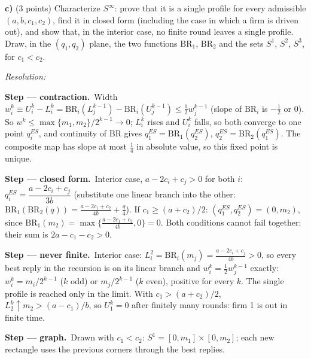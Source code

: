 \documentclass[11pt,a4paper]{article}
\newif\ifsolucoes
\newcommand{\espacoresol}{5cm}   %
\newcommand{\resolespaco}{\ifsolucoes\else\par\textit{Resolution:}\vspace{\espacoresol}\par\fi}
\newcommand{\passo}[2]{\par\smallskip\noindent\textbf{Step --- #1.}~#2}
\begin{document}
\textbf{c)} (3 points) Characterize $S^\infty$: prove that it is a single profile for every
admissible $(a,b,c_1,c_2)$, find it in closed form (including the case in which a firm is driven out),
and show that, in the interior case, no finite round leaves a single profile. Draw, in the
$(q_1,q_2)$ plane, the two functions $\mathrm{BR}_1$, $\mathrm{BR}_2$ and the sets $S^1$, $S^2$,
$S^3$, for $c_1<c_2$.
\resolespaco
\begin{sol}
\passo{contraction}{Width $w_i^k\equiv U_i^k-L_i^k=\mathrm{BR}_i(L_j^{k-1})-\mathrm{BR}_i(U_j^{k-1})\le\tfrac12w_j^{k-1}$
(slope of $\mathrm{BR}_i$ is $-\tfrac12$ or $0$). So $w^k\le\max\{m_1,m_2\}/2^{k-1}\to0$; $L_i^k$
rises and $U_i^k$ falls, so both converge to one point $q_i^{ES}$, and continuity of $\mathrm{BR}$
gives $q_1^{ES}=\mathrm{BR}_1(q_2^{ES})$, $q_2^{ES}=\mathrm{BR}_2(q_1^{ES})$. The composite map has
slope at most $\tfrac14$ in absolute value, so this fixed point is unique.}
\passo{closed form}{Interior case, $a-2c_i+c_j>0$ for both $i$:
$q_i^{ES}=\dfrac{a-2c_i+c_j}{3b}$ (substitute one linear branch into the other:
$\mathrm{BR}_1(\mathrm{BR}_2(q))=\tfrac{a-2c_1+c_2}{4b}+\tfrac q4$). If $c_1\ge(a+c_2)/2$:
$(q_1^{ES},q_2^{ES})=(0,m_2)$, since $\mathrm{BR}_1(m_2)=\max\{\tfrac{a-2c_1+c_2}{4b},0\}=0$. Both
conditions cannot fail together: their sum is $2a-c_1-c_2>0$.}
\passo{never finite}{Interior case: $L_i^2=\mathrm{BR}_i(m_j)=\tfrac{a-2c_i+c_j}{4b}>0$, so every
best reply in the recursion is on its linear branch and $w_i^k=\tfrac12w_j^{k-1}$ exactly:
$w_i^k=m_i/2^{k-1}$ ($k$ odd) or $m_j/2^{k-1}$ ($k$ even), positive for every $k$. The single profile
is reached only in the limit. With $c_1>(a+c_2)/2$, $L_2^k\uparrow m_2>(a-c_1)/b$, so $U_1^k=0$ after
finitely many rounds: firm 1 is out in finite time.}
\passo{graph}{Drawn with $c_1<c_2$: $S^1=[0,m_1]\times[0,m_2]$; each new rectangle uses the previous
corners through the best replies.}
\begin{center}
\end{center}
\end{sol}
\end{document}
